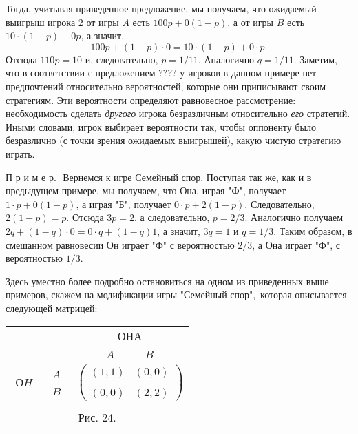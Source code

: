\documentclass[12pt]{article}
\begin{document}
{Тогда, учитывая приведенное предложение, мы получаем, что ожидаемый
выигрыш игрока 2 от игры $A$ есть $100p+0(1-p)$, а от игры $B$ есть
$10\cdot(1-p)+0p$, а значит,
$$
100p+(1-p)\cdot 0=10\cdot (1-p)+0\cdot p.
$$
Отсюда $110p=10$ и, следовательно, $p=1/11$. Аналогично $q=1/11$.
Заметим, что в соответствии с предложением ???? у игроков в данном
примере нет предпочтений относительно вероятностей, которые они
приписывают своим стратегиям. Эти вероятности определяют равновесное
рассмотрение: необходимость сделать {\it другого} игрока
безразличным относительно {\it его} стратегий. Иными словами, игрок
выбирает вероятности так, чтобы оппоненту было безразлично (с точки
зрения ожидаемых выигрышей), какую чистую стратегию играть.
\smallskip

П р и м е р.\,\, Вернемся к игре Семейный спор. Поступая так же, как и в
предыдущем примере, мы получаем, что Она,  играя "Ф", получает
$1\cdot p+0(1-p)$, а играя "Б", получает $0\cdot p+2(1-p)$.
Следовательно, $2(1-p)=p$. Отсюда $3p=2$, а следовательно, $p=2/3$.
Аналогично получаем $2q+(1-q)\cdot 0=0\cdot q+(1-q)1$, а значит,
$3q=1$ и $q=1/3$. Таким образом, в смешанном равновесии Он играет
"Ф" с вероятностью $2/3$, а Она играет "Ф",  с вероятностью $1/3$.

Здесь уместно более подробно остановиться на одном из приведенных
выше примеров, скажем на модификации игры "Семейный спор",\, которая
описывается следующей матрицей:

\begin{center}
\begin{tabular}{ccc}
&&ОHА\\
&&$\begin{array}{cc} A\quad&\quad B\end{array}$\\
$\begin{array}{c} \\ ОH\\ \end{array}$& $\begin{array}{c} A\\ \\
B\end{array}$& $\left(\begin{array}{cc}
(1,1)&(0,0)\\
\\
(0,0)&(2,2)\end{array}\right) $\\
\multicolumn{3}{c}{}\\
\multicolumn{3}{c}{Рис. 24.}\\
\end{tabular}
\end{center}

}
\end{document}
